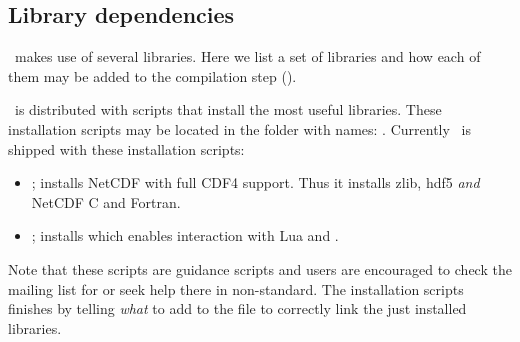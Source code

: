 \subsection{Library dependencies}
\label{sec:libs}

\siesta\ makes use of several libraries. Here we list a set of
libraries and how each of them may be added to the compilation step
().

\siesta\ is distributed with scripts that install the most useful
libraries. These installation scripts may be located in the
 folder with names: .
Currently \siesta\ is shipped with these installation scripts:
\begin{itemize}
  \item {}; installs NetCDF with full CDF4
  support. Thus it installs zlib, hdf5 \emph{and} NetCDF C and
  Fortran.

  \item {}; installs  which
  enables interaction with Lua and \siesta.
  
\end{itemize}
Note that these scripts are guidance scripts and users are encouraged
to check the mailing list for or seek help there in non-standard. The
installation scripts finishes by telling \emph{what} to add to the
 file to correctly link the just installed libraries.

